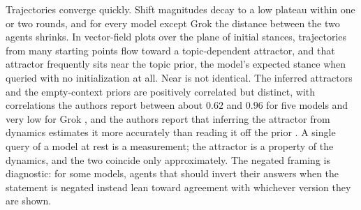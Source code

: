\documentclass[11pt]{article}
\theoremstyle{definition}
\theoremstyle{remark}
\begin{document}
Trajectories converge quickly. Shift magnitudes decay to a low plateau within one or two rounds, and for every model except Grok the distance between the two agents shrinks. In vector-field plots over the plane of initial stances, trajectories from many starting points flow toward a topic-dependent attractor, and that attractor frequently sits near the topic prior, the model's expected stance when queried with no initialization at all. Near is not identical. The inferred attractors and the empty-context priors are positively correlated but distinct, with correlations the authors report between about $0.62$ and $0.96$ for five models and very low for Grok \cite{brockers2026peer}, and the authors report that inferring the attractor from dynamics estimates it more accurately than reading it off the prior \cite{brockers2026}. A single query of a model at rest is a measurement; the attractor is a property of the dynamics, and the two coincide only approximately. The negated framing is diagnostic: for some models, agents that should invert their answers when the statement is negated instead lean toward agreement with whichever version they are shown.
\end{document}

